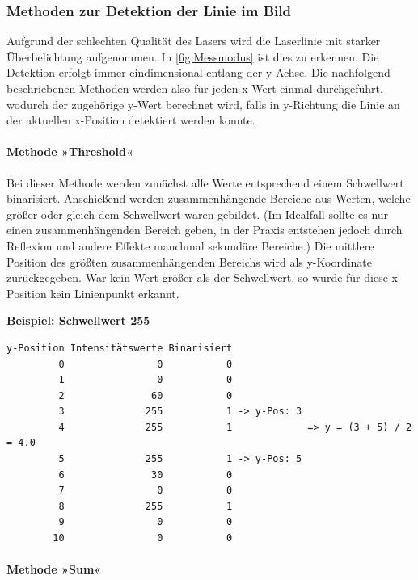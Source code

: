 \documentclass[a4paper,10pt]{scrartcl}
\begin{document}
\subsubsection{Methoden zur Detektion der Linie im Bild}

Aufgrund der schlechten Qualität des Lasers wird die Laserlinie mit starker Überbelichtung aufgenommen.
In \cref{fig:Messmodus} ist dies zu erkennen. Die Detektion erfolgt immer eindimensional entlang der y-Achse. Die
nachfolgend beschriebenen Methoden werden also für jeden x-Wert einmal durchgeführt, wodurch der zugehörige
y-Wert berechnet wird, falls in y-Richtung die Linie an der aktuellen x-Position detektiert werden konnte.

\paragraph{Methode »Threshold«}

Bei dieser Methode werden zunächst alle Werte entsprechend einem Schwellwert binarisiert. Anschießend
werden zusammenhängende Bereiche aus Werten, welche größer oder gleich dem Schwellwert waren gebildet.
(Im Idealfall sollte es nur einen zusammenhängenden Bereich geben, in der Praxis entstehen jedoch durch
Reflexion und andere Effekte manchmal sekundäre Bereiche.) Die mittlere Position des größten
zusammenhängenden Bereichs wird als y-Koordinate zurückgegeben. War kein Wert größer als
der Schwellwert, so wurde für diese x-Position kein Linienpunkt erkannt.

\bigskip
\begin{minipage}{\textwidth} 
\textbf{Beispiel: Schwellwert 255}

\begin{verbatim}
y-Position Intensitätswerte Binarisiert
         0                0           0
         1                0           0
         2               60           0
         3              255           1 -> y-Pos: 3
         4              255           1             => y = (3 + 5) / 2 = 4.0
         5              255           1 -> y-Pos: 5
         6               30           0
         7                0           0
         8              255           1
         9                0           0
        10                0           0
\end{verbatim}
\end{minipage}

\paragraph{Methode »Sum«}
\end{document}
